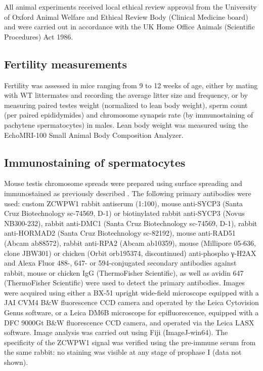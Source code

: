 All animal experiments received local ethical review approval from the University of Oxford Animal Welfare and Ethical Review Body (Clinical Medicine board) and were carried out in accordance with the UK Home Office Animals (Scientific Procedures) Act 1986.

\subsection{Fertility measurements}
\label{sec:fertility}
Fertility was assessed in mice ranging from 9 to 12 weeks of age, either by mating with WT littermates and recording the average litter size and frequency, or by measuring paired testes weight (normalized to lean body weight), sperm count (per paired epididymides) and chromosome synapsis rate (by immunostaining of pachytene spermatocytes) in males.
Lean body weight was measured using the EchoMRI-100 Small Animal Body Composition Analyzer.

\subsection{Immunostaining of spermatocytes}
\label{sec:immunostaining}
Mouse testis chromosome spreads were prepared using surface spreading \parencite{Barchi2008ATM, Peters1997dryingdown} and immunostained as previously described \parencite{Davies2016Reengineering}.
The following primary antibodies were used: custom ZCWPW1 rabbit antiserum (1:100), mouse anti-SYCP3 (Santa Cruz Biotechnology sc-74569, D-1) or biotinylated rabbit anti-SYCP3 (Novus NB300-232), rabbit anti-DMC1 (Santa Cruz Biotechnology sc-74569, D-1), rabbit anti-HORMAD2 (Santa Cruz Biotechnology sc-82192), mouse anti-RAD51 (Abcam ab88572), rabbit anti-RPA2 (Abcam ab10359), mouse (Millipore 05-636, clone JBW301) or chicken (Orbit orb195374, discontinued) anti-phospho γ-H2AX and Alexa Fluor 488-, 647- or 594-conjugated secondary antibodies against rabbit, mouse or chicken IgG (ThermoFisher Scientific), as well as avidin 647 (ThermoFisher Scientific) were used to detect the primary antibodies.
Images were acquired using either a BX-51 upright wide-field microscope equipped with a JAI CVM4 B\&W fluorescence CCD camera and operated by the Leica Cytovision Genus software, or a Leica DM6B microscope for epifluorescence, equipped with a DFC 9000Gt B\&W fluorescence CCD camera, and operated via the Leica LASX software.
Image analysis was carried out using Fiji (ImageJ-win64).
The specificity of the ZCWPW1 signal was verified using the pre-immune serum from the same rabbit: no staining was visible at any stage of prophase I (data not shown).

